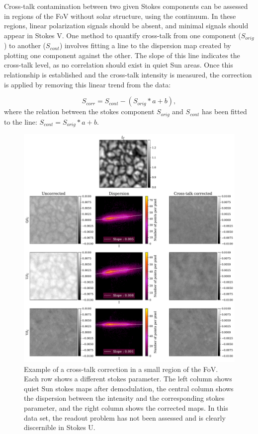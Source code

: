 Cross-talk contamination between two given Stokes components can be assessed in regions of the FoV without solar structure, using the continuum. In these regions, linear polarization signals should be absent, and minimal signals should appear in Stokes V. One method to quantify cross-talk from one component ($S_{orig}$) to another ($S_{cont}$) involves fitting a line to the dispersion map created by plotting one component against the other. The slope of this line indicates the cross-talk level, as no correlation should exist in quiet Sun areas. Once this relationship is established and the cross-talk intensity is measured, the correction is applied by removing this linear trend from the data:

\begin{equation}
  S_{corr} = S_{cont} - (S_{orig} * a + b),
\end{equation}
where the relation between the stokes component $S_{orig}$ and $S_{cont}$ has been fitted to the line: $S_{cont} =  S_{orig} * a + b$.

\begin{figure}
  \includegraphics[width=\textwidth]{figures/Pipeline/xtalk_example.pdf}
  \caption[Cross-talk correction.]{Example of a cross-talk correction in a small region of the FoV. Each row shows a different stokes parameter. The left column shows quiet Sun stokes maps after demodulation, the central column shows the dispersion between the intensity and the corresponding stokes parameter, and the right column shows the corrected maps. In this data set, the readout problem has not been assessed and is clearly discernible in Stokes U.}
    \label{fig_pipeline: xtalk}
\end{figure}


